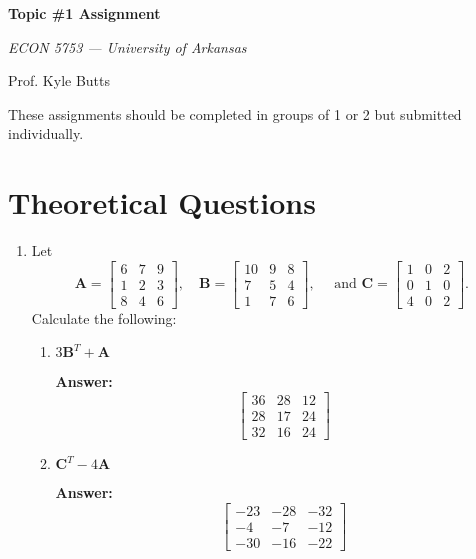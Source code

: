\documentclass[12pt]{article}
\newcommand{\answer}[1]{{\color{blue_winged_teal}\textbf{Answer:} #1}}
\begin{document}
\begin{center}
  {\Huge\bf Topic \#1 Assignment}

  \smallskip
  {\large\it  ECON 5753 — University of Arkansas}

  \medskip
  {\large Prof. Kyle Butts}
\end{center}

These assignments should be completed in groups of 1 or 2 but submitted individually.

\section*{Theoretical Questions}

\begin{enumerate}
  \item Let
  $$
    \bm{A} = \begin{bmatrix} 6 & 7 & 9 \\ 1 & 2 & 3 \\ 8 & 4 & 6 \end{bmatrix},
    \quad
    \bm{B} = \begin{bmatrix} 10 & 9 & 8 \\ 7 & 5 & 4 \\ 1 & 7 & 6 \end{bmatrix},
    \quad \text{ and }
    \bm{C} = \begin{bmatrix} 1 & 0 & 2 \\ 0 & 1 & 0 \\ 4 & 0 & 2 \end{bmatrix}.
  $$
  Calculate the following:

  \begin{enumerate}
    \item $3\bm{B}^T + \bm{A}$

    \answer{
      $$
        \begin{bmatrix}
          36 & 28 & 12 \\
          28 & 17 & 24 \\
          32 & 16 & 24
        \end{bmatrix}
      $$
    }

    \item $\bm{C}^T - 4\bm{A}$

    \answer{
      $$
        \begin{bmatrix}
          -23 & -28 & -32 \\
          -4 & -7 & -12 \\
          -30 & -16 & -22
        \end{bmatrix}
      $$
    }


\end{enumerate}
\end{enumerate}
\end{document}
